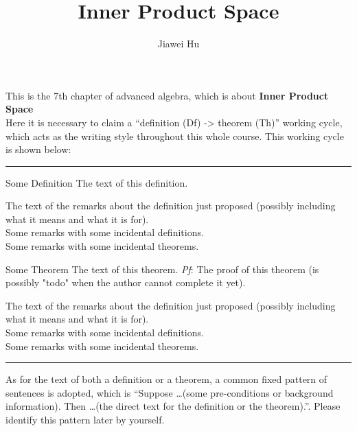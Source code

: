 \documentclass{article}
\title{\LARGE \textbf{Inner Product Space}}
\author{\large Jiawei Hu}
\begin{document}
\maketitle

This is the 7th chapter of advanced algebra, which is about \textbf{Inner Product Space}\\
Here it is necessary to claim a ``definition (Df) -> theorem (Th)'' working cycle, which acts as the writing style throughout this whole course. This working cycle is shown below:

\noindent\rule{\textwidth}{2pt}
\begin{Df}{Some Definition}
    The text of this definition.
\end{Df}

\begin{Rmk}{}
    The text of the remarks about the definition just proposed (possibly including what it means and what it is for).\\
    \textcolor{Df}{Some remarks with some incidental definitions.}\\
    \textcolor{Th}{Some remarks with some incidental theorems.}
\end{Rmk}

\begin{Th}{Some Theorem}
    The text of this theorem.
    \tcblower
    \textit{Pf}: The proof of this theorem (is possibly "todo" when the author cannot complete it yet).
\end{Th}

\begin{Rmk}{}
    The text of the remarks about the definition just proposed (possibly including what it means and what it is for).\\
    \textcolor{Df}{Some remarks with some incidental definitions.}\\
    \textcolor{Th}{Some remarks with some incidental theorems.}
\end{Rmk}
\noindent\rule{\textwidth}{2pt}
As for the text of both a definition or a theorem, a common fixed pattern of sentences is adopted, which is ``Suppose \dots (some pre-conditions or background information). Then \dots (the direct text for the definition or the theorem).''. Please identify this pattern later by yourself. 
\end{document}
